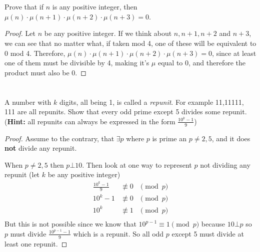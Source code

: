 \documentclass[11pt]{article}
\newcommand{\nequiv}{\not\equiv}
\newenvironment{myproblem}[1][Problem]{\begin{trivlist}
    \item[\hskip \labelsep {\bfseries #1.}]}{\end{trivlist}}
\begin{document}
\section{}
\begin{myproblem}
    Prove that if $n$ is any positive integer, then $\mu(n)\cdot \mu(n+1)\cdot \mu(n+2)\cdot \mu(n+3)=0$.
\end{myproblem}

\begin{proof}
    Let $n$ be any positive integer. If we think about $n, n+1, n+2$ and $n+3$, we can see that no matter what, if taken mod 4, one of these will be equivalent to 0 mod 4. Therefore, $\mu(n)\cdot \mu(n+1)\cdot \mu(n+2)\cdot \mu(n+3)=0$, since at least one of them must be divisible by 4, making it's $\mu$ equal to 0, and therefore the product must also be 0.
\end{proof}


\section{}
\begin{myproblem}
    A number with $k$ digits, all being 1, is called a \textit{repunit}. For example 11,11111, 111 are all repunits. Show that every odd prime except 5 divides some repunit. \big(\textbf{Hint:} all repunits can always be expressed in the form $\frac{10^k-1}{9}$\big)
\end{myproblem}

\begin{proof}
    Assume to the contrary, that $\exists p$ where $p$ is prime an $p\neq 2,5$, and it does \textbf{not} divide any repunit.

    When $p\neq 2,5$ then $p\bot 10$. Then look at one way to represent $p$ not dividing any repunit (let $k$ be any positive integer)
    \[
        \begin{array}{rll}
            \frac{10^k-1}{9} & \nequiv 0 & \pmod{p} \\
            10^k -1          & \nequiv 0 & \pmod{p} \\
            10^k             & \nequiv 1 & \pmod{p} \\
        \end{array}
    \]
    But this is not possible since we know that $10^{p-1}\equiv 1 \pmod{p}$ because $10\bot p$ so $p$ must divide $\frac{10^{p-1}-1}{9}$ which is a repunit. So all odd $p$ except 5 must divide at least one repunit.
\end{proof}
\end{document}
